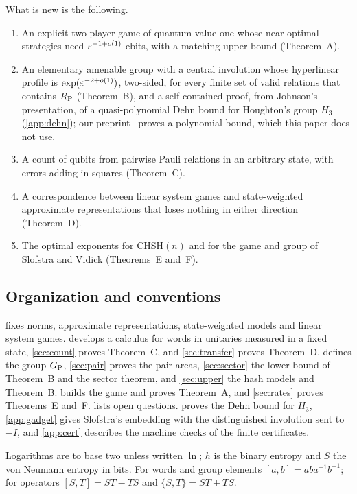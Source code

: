 What is new is the following.
\begin{enumerate}[label=(\arabic*),itemsep=1pt]
\item An explicit two-player game of quantum value one whose near-optimal strategies need $\varepsilon^{-1+o(1)}$ ebits, with a matching upper
bound (Theorem~A).
\item An elementary amenable group with a central involution whose hyperlinear profile is $\exp(\varepsilon^{-2+o(1)})$, two-sided, for every
finite set of valid relations that contains $R_{\mathrm P}$ (Theorem~B), and a self-contained proof, from Johnson's presentation, of a
quasi-polynomial Dehn bound for Houghton's group $H_3$ (\cref{app:dehn}); our preprint~\cite{DM-H3} proves a polynomial bound, which
this paper does not use.
\item A count of qubits from pairwise Pauli relations in an arbitrary state, with errors adding in squares (Theorem~C).
\item A correspondence between linear system games and state-weighted approximate representations that loses nothing in either direction
(Theorem~D).
\item The optimal exponents for CHSH$(n)$ and for the game and group of Slofstra and Vidick (Theorems~E and~F).
\end{enumerate}

\subsection{Organization and conventions}

 fixes norms, approximate representations, state-weighted models and linear system games.  develops a
calculus for words in unitaries measured in a fixed state, \cref{sec:count} proves Theorem~C, and \cref{sec:transfer} proves Theorem~D.
 defines the group $G_{\mathrm P}$, \cref{sec:pair} proves the pair areas, \cref{sec:sector} the lower bound of Theorem~B and the sector
theorem, and \cref{sec:upper} the hash models and Theorem~B.  builds the game and proves Theorem~A, and \cref{sec:rates}
proves Theorems~E and~F.  lists open questions.  proves the Dehn bound for $H_3$, \cref{app:gadget} gives
Slofstra's embedding with the distinguished involution sent to $-I$, and \cref{app:cert} describes the machine checks of the finite
certificates.

Logarithms are to base two unless written $\ln$; $h$ is the binary entropy and $S$ the von Neumann entropy in bits. For words and group
elements $[a,b]=aba^{-1}b^{-1}$; for operators $[S,T]=ST-TS$ and $\{S,T\}=ST+TS$.
